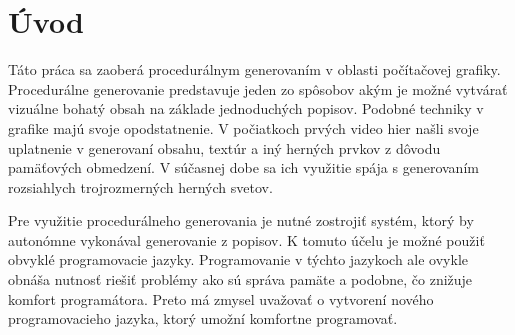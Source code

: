 

\chapter{Úvod}
Táto práca sa zaoberá procedurálnym generovaním v oblasti počítačovej grafiky.
Procedurálne generovanie predstavuje jeden zo spôsobov akým je možné vytvárať vizuálne bohatý obsah na základe jednoduchých popisov. 
Podobné techniky v grafike majú svoje opodstatnenie. V počiatkoch prvých video hier našli svoje uplatnenie v generovaní obsahu, textúr a iný herných prvkov z dôvodu pamäťových obmedzení. 
V súčasnej dobe sa ich využitie spája s generovaním rozsiahlych trojrozmerných herných svetov.

Pre využitie procedurálneho generovania je nutné zostrojiť systém, ktorý by autonómne vykonával generovanie z popisov. K tomuto účelu je možné
použiť obvyklé programovacie jazyky. Programovanie v týchto jazykoch ale ovykle obnáša nutnosť riešiť problémy ako sú správa pamäte a podobne, čo znižuje komfort programátora.
Preto má zmysel uvažovať o vytvorení nového programovacieho jazyka, ktorý umožní komfortne programovať.


